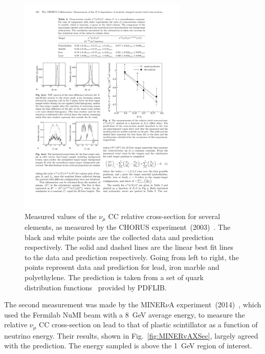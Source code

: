 \begin{figure}%
  \centering
  \includegraphics[width=8cm]{images/neutrino_interactions/CHORUS_XSec.pdf}
  \caption{Measured values of the $\nu_\mu$ CC relative cross-section for several elements, as measured by the CHORUS experiment~(2003)~\cite{CHORUS_XSEC}.  The black and white points are the collected data and prediction respectively.  The solid and dashed lines are the linear best fit lines to the data and prediction respectively.  Going from left to right, the points represent data and prediction for lead, iron marble and polyethylene.  The prediction is taken from a set of quark distribution functions~\cite{Gluck:1998xa} provided by PDFLIB.}
  \label{fig:CHORUSXSec}
\end{figure}
The second measurement was made by the MINER$\nu$A experiment~(2014)~\cite{PhysRevLett.112.231801}, which used the Fermilab NuMI beam with a 8~GeV average energy, to measure the relative $\nu_\mu$ CC cross-section on lead to that of plastic scintillator as a function of neutrino energy.  Their results, shown in Fig.~\ref{fig:MINERvAXSec}, largely agreed with the prediction.  The energy sampled is above the 1~GeV region of interest.
